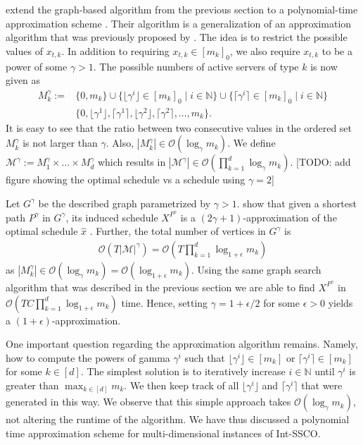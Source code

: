 \citeauthor*{Albers2021_2} extend the graph-based algorithm from the previous section to a polynomial-time approximation scheme \cite{Albers2021_2}. Their algorithm is a generalization of an approximation algorithm that was previously proposed by \citeauthor*{Kappelmann2017} \cite{Kappelmann2017}. The idea is to restrict the possible values of $x_{t,k}$. In addition to requiring $x_{t,k} \in [m_k]_0$, we also require $x_{t,k}$ to be a power of some $\gamma > 1$. The possible numbers of active servers of type $k$ is now given as \begin{align*}
    M_k^{\gamma} := &\{0, m_k\} \cup \{\lfloor\gamma^i\rfloor \in [m_k]_0 \mid i \in \mathbb{N}\} \cup \{\lceil\gamma^i\rceil \in [m_k]_0 \mid i \in \mathbb{N}\} \\
                    &\{0, \lfloor\gamma^1\rfloor, \lceil\gamma^1\rceil, \lfloor\gamma^2\rfloor, \lceil\gamma^2\rceil, \dots, m_k\}.
\end{align*} It is easy to see that the ratio between two consecutive values in the ordered set $M_k^{\gamma}$ is not larger than $\gamma$. Also, $|M_k^{\gamma}| \in \mathcal{O}(\log_{\gamma} m_k)$. We define $\mathcal{M}^{\gamma} := M_1^{\gamma} \times \dots \times M_d^{\gamma}$ which results in $|\mathcal{M}^{\gamma}| \in \mathcal{O}(\prod_{k=1}^d \log_{\gamma} m_k)$. [TODO: add figure showing the optimal schedule vs a schedule using $\gamma = 2$]

Let $G^{\gamma}$ be the described graph parametrized by $\gamma > 1$. \citeauthor*{Albers2021_2} show that given a shortest path $P^{\gamma}$ in $G^{\gamma}$, its induced schedule $X^{P^{\gamma}}$ is a $(2\gamma + 1)$-approximation of the optimal schedule $\hat{x}$ \cite{Albers2021_2}. Further, the total number of vertices in $G^{\gamma}$ is \begin{align*}
    \mathcal{O}(T |\mathcal{M}|^{\gamma}) = \mathcal{O}(T \prod_{k=1}^d \log_{1+\epsilon} m_k)
\end{align*} as $|M_k^{\gamma}| \in \mathcal{O}(\log_{\gamma} m_k) = \mathcal{O}(\log_{1 + \epsilon} m_k)$. Using the same graph search algorithm that was described in the previous section we are able to find $X^{P^{\gamma}}$ in $\mathcal{O}(T C \prod_{k=1}^d \log_{1 + \epsilon} m_k)$ time. Hence, setting $\gamma = 1 + \epsilon / 2$ for some $\epsilon > 0$ yields a $(1+\epsilon)$-approximation.

One important question regarding the approximation algorithm remains. Namely, how to compute the powers of gamma $\gamma^i$ such that $\lfloor\gamma^i\rfloor \in [m_k]$ or $\lceil\gamma^i\rceil \in [m_k]$ for some $k \in [d]$. The simplest solution is to iteratively increase $i \in \mathbb{N}$ until $\gamma^i$ is greater than $\max_{k \in [d]} m_k$. We then keep track of all $\lfloor\gamma^i\rfloor$ and $\lceil\gamma^i\rceil$ that were generated in this way. We observe that this simple approach takes $\mathcal{O}(\log_{\gamma} m_k)$, not altering the runtime of the algorithm. We have thus discussed a polynomial time approximation scheme for multi-dimensional instances of Int-SSCO.
